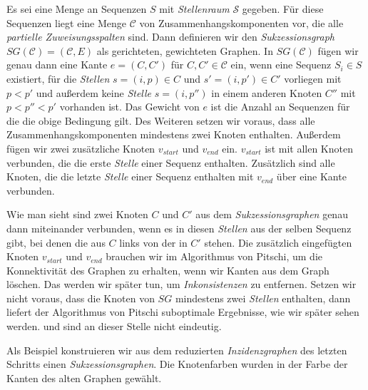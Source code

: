 \begin{definition}[Sukzessionsgraph]
	Es sei eine Menge an Sequenzen $S$ mit \emph{Stellenraum} $\mathcal{S}$ gegeben. Für diese Sequenzen liegt eine Menge $\mathcal{C}$ von Zusammenhangskomponenten vor, die alle \emph{partielle Zuweisungsspalten} sind. Dann definieren wir den \emph{Sukzessionsgraph} $SG(\mathcal{C}) = (\mathcal{C},E)$ als gerichteten, gewichteten Graphen. In $SG(\mathcal{C})$ fügen wir genau dann eine Kante $e = (C,C')$ für $C,C' \in \mathcal{C}$ ein, wenn eine Sequenz $S_i \in S$ existiert, für die \emph{Stellen} $s = (i,p) \in C$ und $s' = (i,p') \in C'$ vorliegen mit $p < p'$ und außerdem keine \emph{Stelle} $s = (i,p'')$ in einem anderen Knoten $C''$ mit $p < p'' < p'$ vorhanden ist. Das Gewicht von $e$ ist die Anzahl an Sequenzen für die die obige Bedingung gilt. Des Weiteren setzen wir voraus, dass alle Zusammenhangskomponenten mindestens zwei Knoten enthalten.
	Außerdem fügen wir zwei zusätzliche Knoten $v_{start}$ und $v_{end}$ ein. $v_{start}$ ist mit allen Knoten verbunden, die die erste \emph{Stelle} einer Sequenz enthalten. Zusätzlich sind alle Knoten, die die letzte \emph{Stelle} einer Sequenz enthalten mit $v_{end}$ über eine Kante verbunden.
\end{definition}


Wie man sieht sind zwei Knoten $C$ und $C'$ aus dem \emph{Sukzessionsgraphen} genau dann miteinander verbunden, wenn es in diesen \emph{Stellen} aus der selben Sequenz gibt, bei denen die aus $C$ links von der in $C'$ stehen. Die zusätzlich eingefügten Knoten $v_{start}$ und $v_{end}$ brauchen wir im Algorithmus von Pitschi, um die Konnektivität des Graphen zu erhalten, wenn wir Kanten aus dem Graph löschen. Das werden wir später tun, um \emph{Inkonsistenzen} zu entfernen. Setzen wir nicht voraus, dass die Knoten von $SG$ mindestens zwei \emph{Stellen} enthalten, dann liefert der Algorithmus von Pitschi suboptimale Ergebnisse, wie wir später sehen werden. \cite{cpm10} und \cite{pdc10} sind an dieser Stelle nicht eindeutig. 

Als Beispiel konstruieren wir aus dem reduzierten \emph{Inzidenzgraphen} des letzten Schritts einen \emph{Sukzessionsgraphen}. Die Knotenfarben wurden in der Farbe der Kanten des alten Graphen gewählt.

